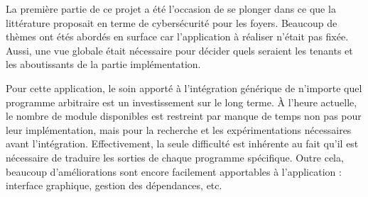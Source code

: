 \documentclass[]{article}
\begin{document}
\par La première partie de ce projet a été l'occasion de se plonger dans ce que la littérature proposait en terme de cybersécurité pour les foyers. Beaucoup de thèmes ont étés abordés en surface car l'application à réaliser n'était pas fixée. Aussi, une vue globale était nécessaire pour décider quels seraient les tenants et les aboutissants de la partie implémentation.\\

\par Pour cette application, le soin apporté à l'intégration générique de n'importe quel programme arbitraire est un investissement sur le long terme. À l'heure actuelle, le nombre de module disponibles est restreint par manque de temps non pas pour leur implémentation, mais pour la recherche et les expérimentations nécessaires avant l'intégration. Effectivement, la seule difficulté est inhérente au fait qu'il est nécessaire de traduire les sorties de chaque programme spécifique. Outre cela, beaucoup d'améliorations sont encore facilement apportables à l'application : interface graphique, gestion des dépendances, etc.

\newpage



\end{document}
